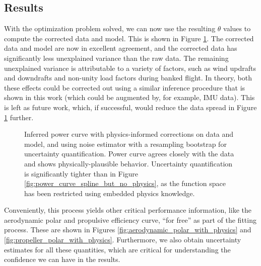 \documentclass[conf]{new-aiaa}
\begin{document}
    \subsection{Results}

    With the optimization problem solved, we can now use the resulting $\theta$ values to compute the corrected data and model. This is shown in Figure \ref{fig:power_curve_with_physics}. The corrected data and model are now in excellent agreement, and the corrected data has significantly less unexplained variance than the raw data. The remaining unexplained variance is attributable to a variety of factors, such as wind updrafts and downdrafts and non-unity load factors during banked flight. In theory, both these effects could be corrected out using a similar inference procedure that is shown in this work (which could be augmented by, for example, IMU data). This is left as future work, which, if successful, would reduce the data spread in Figure \ref{fig:power_curve_with_physics} further.

    \begin{figure}[h]
        \centering
        \caption{Inferred power curve with physics-informed corrections on data and model, and using noise estimator with a resampling bootstrap for uncertainty quantification. Power curve agrees closely with the data and shows physically-plausible behavior. Uncertainty quantification is significantly tighter than in Figure \ref{fig:power_curve_spline_but_no_physics}, as the function space has been restricted using embedded physics knowledge.}
        \label{fig:power_curve_with_physics}
    \end{figure}

    Conveniently, this process yields other critical performance information, like the aerodynamic polar and propulsive efficiency curve, ``for free'' as part of the fitting process. These are shown in Figures \ref{fig:aerodynamic_polar_with_physics} and \ref{fig:propeller_polar_with_physics}. Furthermore, we also obtain uncertainty estimates for all these quantities, which are critical for understanding the confidence we can have in the results.
\end{document}
